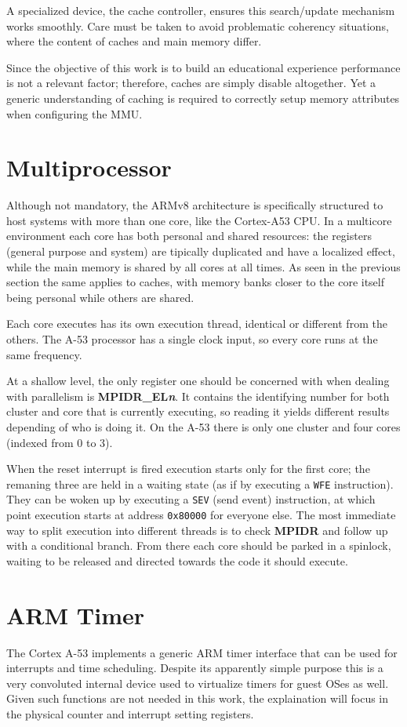 \documentclass[12pt,a4paper,openright,twoside]{report}
\begin{document}
A specialized device, the cache controller, ensures this search/update mechanism
works smoothly. Care must be taken to avoid problematic coherency situations, where
the content of caches and main memory differ.

Since the objective of this work is to build an educational experience performance
is not a relevant factor; therefore, caches are simply disable altogether.
Yet a generic understanding of caching is required to correctly setup memory
attributes when configuring the MMU.

\section{Multiprocessor}
Although not mandatory, the ARMv8 architecture is specifically structured to 
host systems with more than one core, like the Cortex-A53 CPU.
In a multicore environment each core has both personal and shared resources:
the registers (general purpose and system) are tipically duplicated and have a
localized effect, while the main memory is shared by all cores at all times.
As seen in the previous section the same applies to caches, with memory banks closer
to the core itself being personal while others are shared.

Each core executes has its own execution thread, identical or different from 
the others. The A-53 processor has a single clock input, so every core runs at
the same frequency.

At a shallow level, the only register one should be concerned with when dealing 
with parallelism is \textbf{MPIDR\_EL\textit{n}}. It contains the identifying number
for both cluster and core that is currently executing, so reading it yields different
results depending of who is doing it. On the A-53 there is only
one cluster and four cores (indexed from 0 to 3).

When the reset interrupt is fired execution starts only for the first core; the
remaning three are held in a waiting state (as if by executing a {\tt WFE} instruction).
They can be woken up by executing a {\tt SEV} (send event) instruction, at which
point execution starts at address {\tt 0x80000} for everyone else.
The most immediate way to split execution into different threads is to check 
\textbf{MPIDR} and follow up with a conditional branch. From there each core should be parked in 
a spinlock, waiting to be released and directed towards the code it should
execute.

\section{ARM Timer}
The Cortex A-53 implements a generic ARM timer interface that can be used for interrupts
and time scheduling. Despite its apparently simple purpose this is a very convoluted
internal device used to virtualize timers for guest OSes as well.
Given such functions are not needed in this work, the explaination will focus 
in the physical counter and interrupt setting registers.
\end{document}

